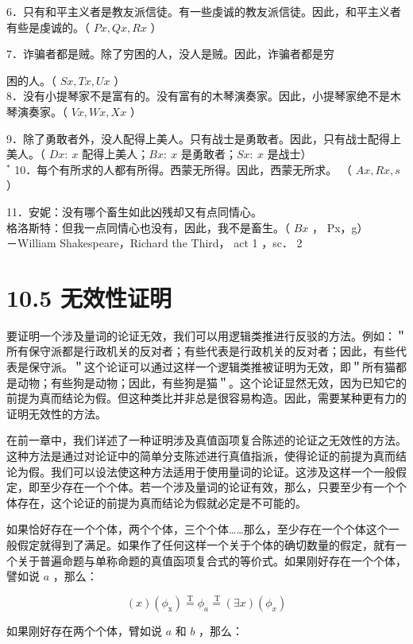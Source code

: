 6．只有和平主义者是教友派信徒。有一些虔诚的教友派信徒。因此，和平主义者有些是虔诚的。（ $P x, Q x, R x$ ）

7．诈骗者都是贼。除了穷困的人，没人是贼。因此，诈骗者都是穷

困的人。（ $S x, T x, U x$ ）\\
8．没有小提琴家不是富有的。没有富有的木琴演奏家。因此，小提琴家绝不是木琴演奏家。（ $V x, W x, X x$ ）

9．除了勇敢者外，没人配得上美人。只有战士是勇敢者。因此，只有战士配得上美人。（ $D x: ~ x$ 配得上美人；$B x: ~ x$ 是勇敢者；$S x: ~ x$ 是战士）\\
${ }^{*}$ 10．每个有所求的人都有所得。西蒙无所得。因此，西蒙无所求。 （ $A x, R x, s$ ）

11．安妮：没有哪个畜生如此凶残却又有点同情心。\\
格洛斯特：但我一点同情心也没有，因此，我不是畜生。（ $B x$ ， Px，g）\\
－William Shakespeare，Richard the Third， act 1 ，sc． 2

\section*{10.5 无效性证明}
要证明一个涉及量词的论证无效，我们可以用逻辑类推进行反驳的方法。例如：＂所有保守派都是行政机关的反对者；有些代表是行政机关的反对者；因此，有些代表是保守派。＂这个论证可以通过这样一个逻辑类推被证明为无效，即＂所有猫都是动物；有些狗是动物；因此，有些狗是猫＂。这个论证显然无效，因为已知它的前提为真而结论为假。但这种类比并非总是很容易构造。因此，需要某种更有力的证明无效性的方法。

在前一章中，我们详述了一种证明涉及真值函项复合陈述的论证之无效性的方法。这种方法是通过对论证中的简单分支陈述进行真值指派，使得论证的前提为真而结论为假。我们可以设法使这种方法适用于使用量词的论证。这涉及这样一个一般假定，即至少存在一个个体。若一个涉及量词的论证有效，那么，只要至少有一个个体存在，这个论证的前提为真而结论为假就必定是不可能的。

如果恰好存在一个个体，两个个体，三个个体……那么，至少存在一个个体这个一般假定就得到了满足。如果作了任何这样一个关于个体的确切数量的假定，就有一个关于普遍命题与单称命题的真值函项复合式的等价式。如果刚好存在一个个体，譬如说 $a$ ，那么：

$$
(x)\left(\phi_{\mathrm{x}}\right) \stackrel{\mathrm{T}}{=} \phi_{a} \stackrel{\mathrm{~T}}{=}(\exists x)\left(\phi_{x}\right)
$$

如果刚好存在两个个体，臂如说 $a$ 和 $b$ ，那么：

